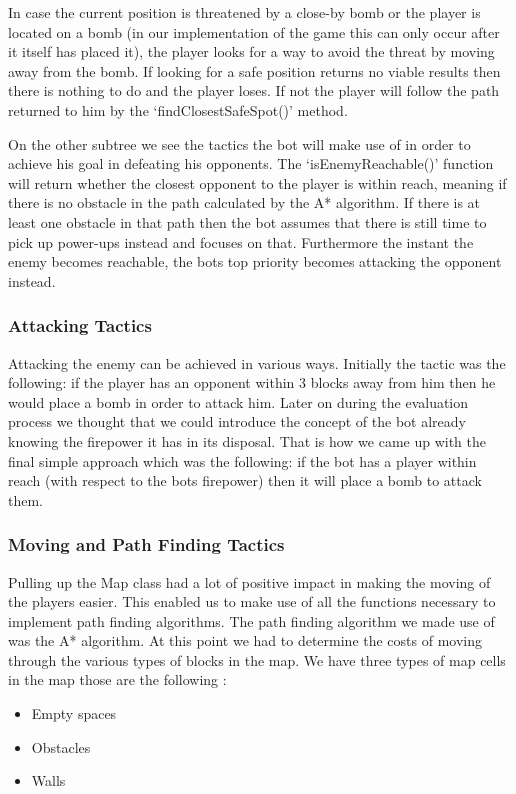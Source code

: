 In case the current position is threatened by a close-by bomb or the player is
located on a bomb (in our implementation of the game this can only occur after
it itself has placed it), the player looks for a way to avoid the threat by
moving away from the bomb. If looking for a safe position returns no viable
results then there is nothing to do and the player loses. If not the player will
follow the path returned to him by the `findClosestSafeSpot()' method.

On the other subtree we see the tactics the bot will make use of in order to
achieve his goal in defeating his opponents. The `isEnemyReachable()' function
will return whether the closest opponent to the player is within reach,
meaning if there is no obstacle in the path calculated by the A* algorithm. If
there is at least one obstacle in that path then the bot assumes that there is
still time to pick up power-ups instead and focuses on that. Furthermore the
instant the enemy becomes reachable, the bots top priority becomes attacking
the opponent instead.

\subsubsection{Attacking Tactics}
Attacking the enemy can be achieved in various ways. Initially the tactic was the following: if the player has an opponent within 3 blocks away from him then he would place a bomb in order to attack him. Later on during the evaluation process we thought that we could introduce the concept of the bot already knowing the firepower it has in its disposal. That is how we came up with the final simple approach which was the following: if the bot has a player within reach (with respect to the bots firepower) then it will place a bomb to attack them.

\subsubsection{Moving and Path Finding Tactics}
Pulling up the Map class had a lot of positive impact in making the moving of the players easier. This enabled us to make use of all the functions necessary to implement path finding algorithms. The path finding algorithm we made use of was the A* algorithm. At this point we had to determine the costs of moving through the various types of blocks in the map. We have three types of map cells in the map those are the following :
\begin{itemize}
\item Empty spaces
\item Obstacles
\item Walls
\end{itemize}

